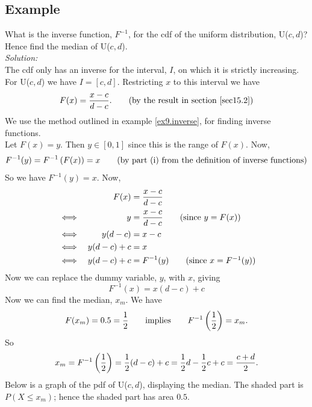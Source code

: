 \subsection{Example}
What is the inverse function, $F^{-1}$, for the cdf of the uniform distribution, U($c,d$)? Hence find the median of U($c,d$). \\

\noindent \textit{Solution:} \\
The cdf only has an inverse for the interval, $I$, on which it is strictly increasing. For U($c,d$) we have $I = [c,d]$. Restricting $x$ to this interval we have
\[
F(x) = \frac{x-c}{d-c}. \tag{by the result in section \ref{sec15.2}}
\]
We use the method outlined in example \ref{ex9.inverse}, for finding inverse functions. \\
Let $F(x) = y$. Then $y \in [0,1]$ since this is the range of $F(x)$. Now,
\[
F^{-1}(y) = F^{-1}\left(F(x)\right) = x \tag{by part (i) from the definition of inverse functions}
\]
So we have $F^{-1}(y) = x$. Now,
\begin{alignat*}{2}
&
& F(x)  
& = \frac{x-c}{d-c} \\
& \iff
& y
& = \frac{x-c}{d-c} \tag{since $y = F(x)$} \\
& \iff
& y(d-c)
& = x - c \\
& \iff
& y(d-c) + c
& = x \\
& \iff
& y(d-c) + c 
& = F^{-1}(y) \tag{since $x = F^{-1}(y)$}
\end{alignat*}
Now we can replace the dummy variable, $y$, with $x$, giving
\[
F^{-1}(x) = x(d-c) + c 
\]
Now we can find the median, $x_m$. We have
\[
F(x_m) = 0.5 = \frac{1}{2} \qquad \text{implies} \qquad F^{-1}\left(\frac{1}{2}\right) = x_m.
\]
So
\[
x_m = F^{-1}\left(\frac{1}{2}\right) = \frac{1}{2}(d-c) + c = \frac{1}{2}d - \frac{1}{2}c + c = \frac{c + d}{2}. 
\]
Below is a graph of the pdf of U($c,d$), displaying the median. The shaded part is $P(X \leq x_m)$; hence the shaded part has area $0.5$.
\begin{center}
\end{center}